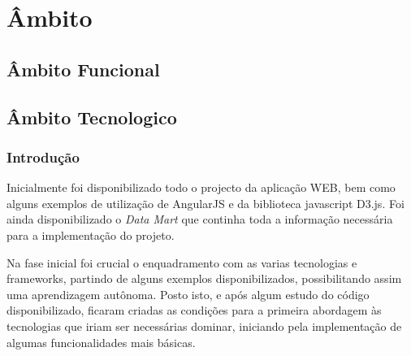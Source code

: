 \chapter{Âmbito}
\label{cap3}

\section{Âmbito Funcional}

\section{Âmbito Tecnologico}
\subsection{Introdução}
\par Inicialmente foi disponibilizado todo o projecto da aplicação WEB, bem como alguns exemplos de utilização de AngularJS e da biblioteca javascript D3.js. Foi ainda disponibilizado o \textit{Data Mart} que continha toda a informação necessária para a implementação do projeto. 
\par Na fase inicial foi crucial o enquadramento com as varias tecnologias e frameworks, partindo de alguns exemplos disponibilizados, possibilitando assim uma aprendizagem autônoma. Posto isto, e após algum estudo do código disponibilizado,  ficaram criadas as condições para a primeira abordagem às tecnologias que iriam ser necessárias dominar, iniciando pela implementação de algumas funcionalidades mais básicas. 
